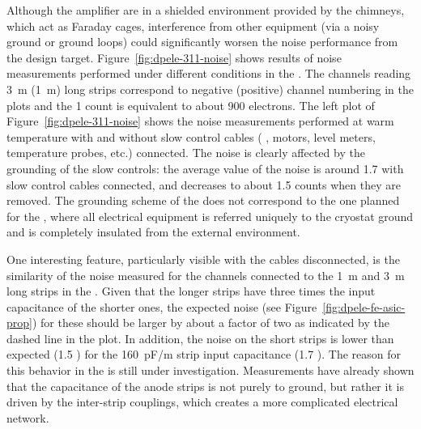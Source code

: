 Although the  amplifier  are in a shielded environment provided by the chimneys, which act as Faraday cages,
interference from other equipment (via a noisy ground or ground loops) could significantly worsen the noise performance from the design target. Figure~\ref{fig:dpele-311-noise} shows %
results of %
noise measurements performed under different conditions in the . The channels reading \SI{3}{\meter} (\SI{1}{\metre}) long strips correspond to negative (positive) channel numbering in the plots and the \num{1}  count is equivalent to about \num{900} electrons. The left plot of Figure~\ref{fig:dpele-311-noise} shows the noise measurements performed at warm temperature with and without slow control cables ( ,  motors, level meters, temperature probes, etc.) connected. 
The noise is clearly affected by the grounding of the slow controls: the average value of the noise \rms is around \num{1.7}  with slow control cables connected, and decreases to about \num{1.5}  counts when they are removed. %
The grounding scheme of the  does not correspond to the one %
planned for the , where all electrical equipment is referred uniquely to the cryostat ground and is completely insulated from the external environment. 

One interesting feature, particularly visible with the cables disconnected, is %
the similarity of the noise measured for the channels connected to the \SI{1}{\meter} and \SI{3}{\meter} long strips in the . 
Given that the longer strips have %
three times the input capacitance of the shorter ones, the expected noise (see Figure~\ref{fig:dpele-fe-asic-prop}) for these should be larger by about a factor of two as indicated by the dashed line in the plot. In addition, the noise on the short strips is lower than expected (\num{1.5} ) for the \SI{160}{pF/m} strip input capacitance (\num{1.7} ). The reason for this behavior %
in the  is still under investigation. %
Measurements have already shown that the capacitance of the  anode strips is not purely to ground, but rather it is driven by the inter-strip couplings, which creates a more complicated electrical network. 

